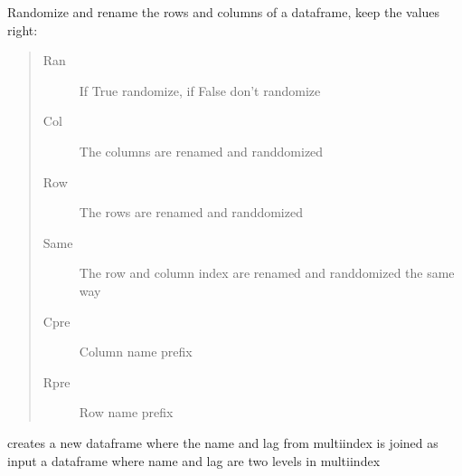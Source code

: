 \documentclass[letterpaper,10pt,english]{sphinxmanual}
\begin{document}
\begin{fulllineitems}
\label{\detokenize{index:modelclass.randomdf}}
\pysigstartsignatures
{}
\pysigstopsignatures
\sphinxAtStartPar
Randomize and rename the rows and columns of a dataframe, keep the values right:
\begin{quote}\begin{description}
\item[{Ran}] \leavevmode
\sphinxAtStartPar
If True randomize, if False don’t randomize

\item[{Col}] \leavevmode
\sphinxAtStartPar
The columns are renamed and randdomized

\item[{Row}] \leavevmode
\sphinxAtStartPar
The rows are renamed and randdomized

\item[{Same}] \leavevmode
\sphinxAtStartPar
The row and column index are renamed and randdomized the same way

\item[{Cpre}] \leavevmode
\sphinxAtStartPar
Column name prefix

\item[{Rpre}] \leavevmode
\sphinxAtStartPar
Row name prefix

\end{description}\end{quote}

\end{fulllineitems}


\begin{fulllineitems}
\label{\detokenize{index:modelclass.join_name_lag}}
\pysigstartsignatures
{}
\pysigstopsignatures
\sphinxAtStartPar
creates a new dataframe where  the name and lag from multiindex is joined
as input a dataframe where name and lag are two levels in multiindex

\end{fulllineitems}
\end{document}
